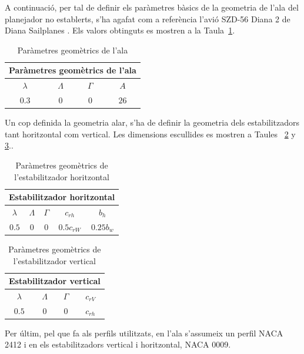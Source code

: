 A continuació, per tal de definir els paràmetres bàsics de la geometria de l'ala del planejador no establerts, s'ha agafat com a referència l'avió SZD-56 Diana 2 de Diana Sailplanes \cite{Kubrynski2006}. Els valors obtinguts es mostren a la Taula~\ref{tab:WingGeom}.

\begin{table} [h]
	\centering
	\caption{Paràmetres geomètrics de l'ala} \label{tab:WingGeom}
	\vspace{10pt}
	\begin{tabular}{| c | c | c | c |}	
		\hline
		\multicolumn{4}{|c|}{\bfseries Paràmetres geomètrics de l'ala} \\
		\hline\hline
	\textbf{$\lambda$} & \textbf{$\Lambda$} & \textbf{$\Gamma$} & \textbf{$A$}\\ \hline 
		$0.3$ & $0$ & $0$ & $26$\\
		\hline	
	\end{tabular} 
\end{table}

Un cop definida la geometria alar, s'ha de definir la geometria dels estabilitzadors tant horitzontal com vertical. Les dimensions escullides es mostren a Taules~ \ref{tab:HSGeom} y \ref{tab:VSGeom}..

\begin{table} [h]
	\centering
	\caption{Paràmetres geomètrics de l'estabilitzador horitzontal} \label{tab:HSGeom}
	\vspace{10pt}
	\begin{tabular}{| c | c | c | c | c |}	
		\hline
		\multicolumn{5}{|c|}{\bfseries Estabilitzador horitzontal} \\
		\hline\hline
	\textbf{$\lambda$} & \textbf{$\Lambda$} & \textbf{$\Gamma$} & \textbf{$c_{rh}$} & \textbf{$b_{h}$} \\ \hline
		$0.5$ & $0$ & $0$ & $0.5c_{rW}$ & $0.25b_{w}$\\
		\hline	
	\end{tabular} 
\end{table}

\begin{table} [h]
	\centering
	\caption{Paràmetres geomètrics de l'estabilitzador vertical} \label{tab:VSGeom}
	\vspace{10pt}
	\begin{tabular}{| c | c | c | c |}	
		\hline
		\multicolumn{4}{|c|}{\bfseries Estabilitzador vertical} \\
		\hline\hline
	\textbf{$\lambda$} & \textbf{$\Lambda$} & \textbf{$\Gamma$} & \textbf{$c_{rV}$}  \\ \hline
		$0.5$ & $0$ & $0$ & $c_{rh}$ \\
		\hline	
	\end{tabular} 
\end{table}

Per últim, pel que fa als perfils utilitzats, en l'ala s'assumeix un perfil NACA 2412 i en els estabilitzadors vertical i horitzontal, NACA 0009.